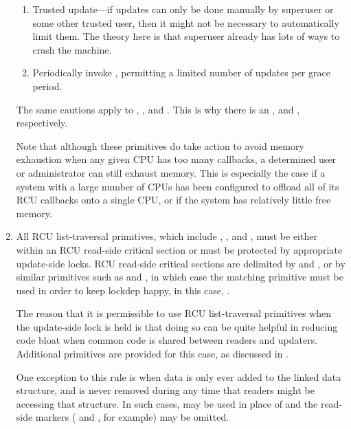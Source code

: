\begin{enumerate}[start=0]
\begin{enumerate}
	\item	Trusted update---if updates can only be done manually by
		superuser or some other trusted user, then it might not
		be necessary to automatically limit them.
		The theory
		here is that superuser already has lots of ways to crash
		the machine.

	\item	Periodically invoke , permitting a limited
		number of updates per grace period.
	\end{enumerate}

	The same cautions apply to , , and
	.
	This is why there is an ,
	and , respectively.

	Note that although these primitives do take action to avoid
	memory exhaustion when any given CPU has too many callbacks,
	a determined user or administrator can still exhaust memory.
	This is especially the case if a system with a large number of
	CPUs has been configured to offload all of its RCU callbacks onto
	a single CPU, or if the system has relatively little free memory.

\item	All RCU list-traversal primitives, which include
	, , and
	, must be either within an RCU read-side
	critical section or must be protected by appropriate update-side
	locks.
	RCU read-side critical sections are delimited by
	 and , or by similar primitives
	such as  and , in which
	case the matching  primitive must be used in
	order to keep lockdep happy, in this case, .

	The reason that it is permissible to use RCU list-traversal
	primitives when the update-side lock is held is that doing so
	can be quite helpful in reducing code bloat when common code is
	shared between readers and updaters.
	Additional primitives
	are provided for this case, as discussed in .

	One exception to this rule is when data is only ever added to
	the linked data structure, and is never removed during any
	time that readers might be accessing that structure.
	In such
	cases,  may be used in place of 
	and the read-side markers ( and ,
	for example) may be omitted.


\end{enumerate}
